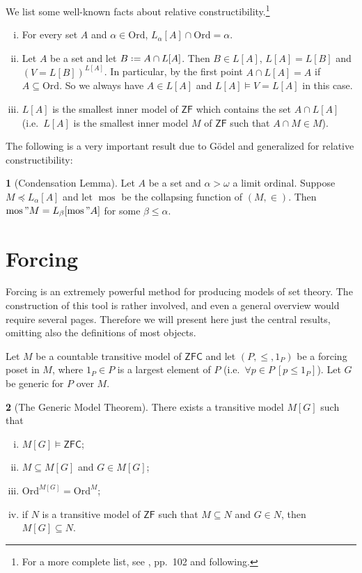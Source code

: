 \documentclass[11pt,a4paper]{report}
\theoremstyle{definition}
\theoremstyle{num.custom-title}
\theoremstyle{custom-title}
\newtheorem*{teo_custom-title_nonum}{}
\DeclareMathOperator{\sse}{\subseteq}
\DeclareMathOperator{\mos}{mos}
\newcommand{\ZF}{\ensuremath{\mathsf{ZF}}\xspace}
\newcommand{\ZFC}{\ensuremath{\mathsf{ZFC}}\xspace}
\newcommand{\Ord}{\mathrm{Ord}}
\newcommand*{\defeq}{\mathrel{\rlap{%
                     \raisebox{0.3ex}{$\cdot$}}%
                     \raisebox{-0.3ex}{$\cdot$}}%
                     =}
\begin{document}
We list some well-known facts about relative constructibility.\footnote{For a more complete list, see \cite{Dev1984}, pp.\ 102 and following.}
\begin{enumerate}[i)]
\item For every set $A$ and $\alpha \in \Ord$, $L_\alpha [A] \cap \Ord = \alpha$.
\item Let $A$ be a set and let $B \defeq A \cap L[A]$. Then $B \in L[A]$, $L[A] = L[B]$ and $(V=L[B])^{L[A]}$. In particular, by the first point $A \cap L[A] = A$ if $A \sse \Ord$. So we always have $A \in L[A]$ and $L[A] \models V = L[A]$ in this case.
\item $L[A]$ is the smallest inner model of \ZF which contains the set $A \cap L[A]$ (i.e.\ $L[A]$ is the smallest inner model $M$ of \ZF such that $A \cap M \in M$).
\end{enumerate}

The following is a very important result due to Gödel and generalized for relative constructibility:

\begin{teo_custom-title_nonum}[Condensation Lemma]
Let $A$ be a set and $\alpha > \omega$ a limit ordinal. Suppose $M \preceq L_\alpha[A]$ and let $\mos$ be the collapsing function of $(M,\in)$. Then $\mos" M = L_\beta [\mos" A]$ for some $\beta \leq \alpha$.
\end{teo_custom-title_nonum}


\section*{Forcing}

Forcing is an extremely powerful method for producing models of set theory. The construction of this tool is rather involved, and even a general overview would require several pages. Therefore we will present here just the central results, omitting also the definitions of most objects.

Let $M$ be a countable transitive model of \ZFC and let $(P, \leq, 1_P)$ be a forcing poset in $M$, where $1_P \in P$ is a largest element of $P$ (i.e.\ $\forall p \in P \ [p \leq 1_P]$). Let $G$ be generic for $P$ over $M$.

\begin{teo_custom-title_nonum}[The Generic Model Theorem]
There exists a transitive model $M[G]$ such that
\begin{enumerate}[(i)]
\item $M[G] \models \ZFC$;
\item $M \sse M[G]$ and $G \in M[G]$;
\item $\Ord^{M[G]} = \Ord^M$;
\item if $N$ is a transitive model of \ZF such that $M \sse N$ and $G \in N$, then $M[G] \sse N$.
\end{enumerate}
\end{teo_custom-title_nonum}
\end{document}
